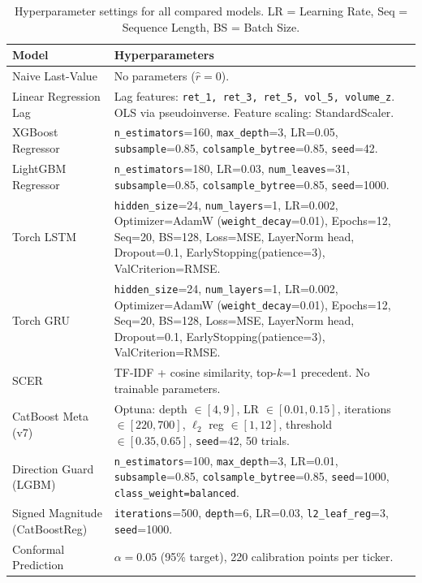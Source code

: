 \documentclass[runningheads]{llncs}
\begin{document}
\begin{table}[htbp]
\centering
\caption{Hyperparameter settings for all compared models. LR = Learning Rate, Seq = Sequence Length, BS = Batch Size.}
\label{tabhyperparams}
\begin{tabular}{p{2.5cm}p{8.5cm}}
\toprule
Model & Hyperparameters \\
\midrule
Naive Last-Value & No parameters ($\hat{r}=0$). \\
Linear Regression Lag & Lag features: \texttt{ret\_1, ret\_3, ret\_5, vol\_5, volume\_z}. OLS via pseudoinverse. Feature scaling: StandardScaler. \\
XGBoost Regressor & \texttt{n\_estimators}=160, \texttt{max\_depth}=3, LR=0.05, \texttt{subsample}=0.85, \texttt{colsample\_bytree}=0.85, \texttt{seed}=42. \\
LightGBM Regressor & \texttt{n\_estimators}=180, LR=0.03, \texttt{num\_leaves}=31, \texttt{subsample}=0.85, \texttt{colsample\_bytree}=0.85, \texttt{seed}=1000. \\
Torch LSTM & \texttt{hidden\_size}=24, \texttt{num\_layers}=1, LR=0.002, Optimizer=AdamW (\texttt{weight\_decay}=0.01), Epochs=12, Seq=20, BS=128, Loss=MSE, LayerNorm head, Dropout=0.1, EarlyStopping(patience=3), ValCriterion=RMSE. \\
Torch GRU & \texttt{hidden\_size}=24, \texttt{num\_layers}=1, LR=0.002, Optimizer=AdamW (\texttt{weight\_decay}=0.01), Epochs=12, Seq=20, BS=128, Loss=MSE, LayerNorm head, Dropout=0.1, EarlyStopping(patience=3), ValCriterion=RMSE. \\
SCER & TF-IDF + cosine similarity, top-$k$=1 precedent. No trainable parameters. \\
CatBoost Meta (v7) & Optuna: depth $\in [4,9]$, LR $\in [0.01,0.15]$, iterations $\in [220,700]$, $\ell_2$ reg $\in [1,12]$, threshold $\in [0.35,0.65]$, \texttt{seed}=42, 50 trials. \\
Direction Guard (LGBM) & \texttt{n\_estimators}=100, \texttt{max\_depth}=3, LR=0.01, \texttt{subsample}=0.85, \texttt{colsample\_bytree}=0.85, \texttt{seed}=1000, \texttt{class\_weight=balanced}. \\
Signed Magnitude (CatBoostReg) & \texttt{iterations}=500, \texttt{depth}=6, LR=0.03, \texttt{l2\_leaf\_reg}=3, \texttt{seed}=1000. \\
Conformal Prediction & $\alpha=0.05$ (95\% target), 220 calibration points per ticker. \\
\bottomrule
\end{tabular}
\end{table}
\end{document}
